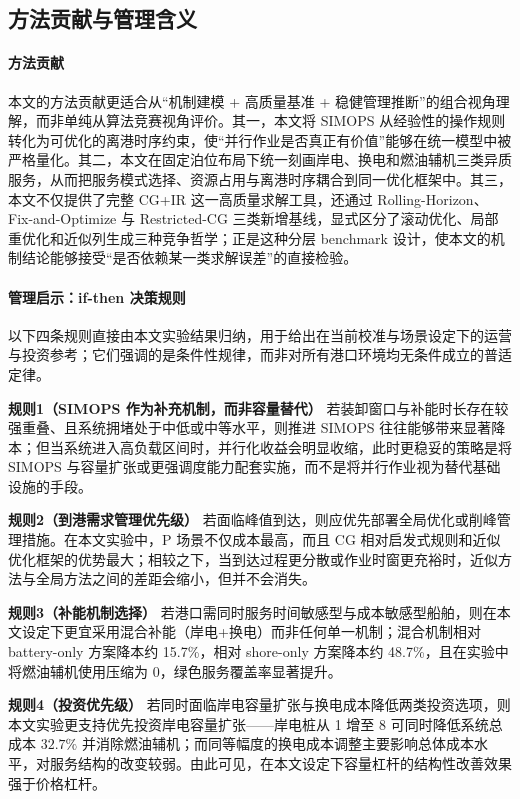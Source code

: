\documentclass[UTF8, a4paper, 12pt]{ctexart}
\theoremstyle{plain}
\theoremstyle{definition}
\theoremstyle{remark}
\begin{document}
\subsection{方法贡献与管理含义}
\label{sec:contributions}

\paragraph{方法贡献}
本文的方法贡献更适合从“机制建模 + 高质量基准 + 稳健管理推断”的组合视角理解，而非单纯从算法竞赛视角评价。其一，本文将 SIMOPS 从经验性的操作规则转化为可优化的离港时序约束，使“并行作业是否真正有价值”能够在统一模型中被严格量化。其二，本文在固定泊位布局下统一刻画岸电、换电和燃油辅机三类异质服务，从而把服务模式选择、资源占用与离港时序耦合到同一优化框架中。其三，本文不仅提供了完整 CG+IR 这一高质量求解工具，还通过 Rolling-Horizon、Fix-and-Optimize 与 Restricted-CG 三类新增基线，显式区分了滚动优化、局部重优化和近似列生成三种竞争哲学；正是这种分层 benchmark 设计，使本文的机制结论能够接受“是否依赖某一类求解误差”的直接检验。

\paragraph{管理启示：if-then 决策规则}
以下四条规则直接由本文实验结果归纳，用于给出在当前校准与场景设定下的运营与投资参考；它们强调的是条件性规律，而非对所有港口环境均无条件成立的普适定律。

\textbf{规则1（SIMOPS 作为补充机制，而非容量替代）}
若装卸窗口与补能时长存在较强重叠、且系统拥堵处于中低或中等水平，则推进 SIMOPS 往往能够带来显著降本；但当系统进入高负载区间时，并行化收益会明显收缩，此时更稳妥的策略是将 SIMOPS 与容量扩张或更强调度能力配套实施，而不是将并行作业视为替代基础设施的手段。

\textbf{规则2（到港需求管理优先级）}
若面临峰值到达，则应优先部署全局优化或削峰管理措施。在本文实验中，P 场景不仅成本最高，而且 CG 相对启发式规则和近似优化框架的优势最大；相较之下，当到达过程更分散或作业时窗更充裕时，近似方法与全局方法之间的差距会缩小，但并不会消失。

\textbf{规则3（补能机制选择）}
若港口需同时服务时间敏感型与成本敏感型船舶，则在本文设定下更宜采用混合补能（岸电+换电）而非任何单一机制；混合机制相对 battery-only 方案降本约 15.7\%，相对 shore-only 方案降本约 48.7\%，且在实验中将燃油辅机使用压缩为 0，绿色服务覆盖率显著提升。

\textbf{规则4（投资优先级）}
若同时面临岸电容量扩张与换电成本降低两类投资选项，则本文实验更支持优先投资岸电容量扩张——岸电桩从 1 增至 8 可同时降低系统总成本 $32.7\%$ 并消除燃油辅机；而同等幅度的换电成本调整主要影响总体成本水平，对服务结构的改变较弱。由此可见，在本文设定下容量杠杆的结构性改善效果强于价格杠杆。
\end{document}
